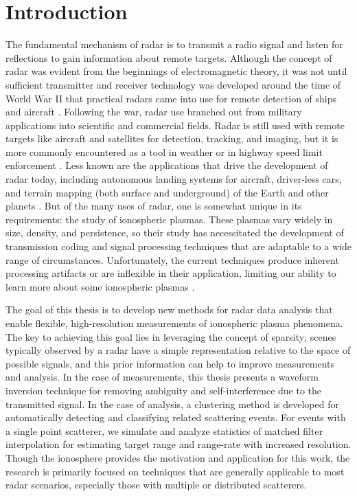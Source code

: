 \chapter{Introduction}
\label{introduction}
The fundamental mechanism of radar is to transmit a radio signal and listen for reflections to gain information about remote targets. Although the concept of radar was evident from the beginnings of electromagnetic theory, it was not until sufficient transmitter and receiver technology was developed around the time of World War II that practical radars came into use for remote detection of ships and aircraft \autocite{Sko01}. Following the war, radar use branched out from military applications into scientific and commercial fields. Radar is still used with remote targets like aircraft and satellites for detection, tracking, and imaging, but it is more commonly encountered as a tool in weather or in highway speed limit enforcement \autocite{MS14}. Less known are the applications that drive the development of radar today, including autonomous landing systems for aircraft, driver-less cars, and terrain mapping (both surface and underground) of the Earth and other planets \autocite{Jol09, MS12}. But of the many uses of radar, one is somewhat unique in its requirements: the study of ionospheric plasmas. These plasmas vary widely in size, density, and persistence, so their study has necessitated the development of transmission coding and signal processing techniques that are adaptable to a wide range of circumstances. Unfortunately, the current techniques produce inherent processing artifacts or are inflexible in their application, limiting our ability to learn more about some ionospheric plasmas \autocite{VLV08a}.

The goal of this thesis is to develop new methods for radar data analysis that enable flexible, high-resolution measurements of ionospheric plasma phenomena. The key to achieving this goal lies in leveraging the concept of sparsity; scenes typically observed by a radar have a simple representation relative to the space of possible signals, and this prior information can help to improve measurements and analysis. In the case of measurements, this thesis presents a waveform inversion technique for removing ambiguity and self-interference due to the transmitted signal. In the case of analysis, a clustering method is developed for automatically detecting and classifying related scattering events. For events with a single point scatterer, we simulate and analyze statistics of matched filter interpolation for estimating target range and range-rate with increased resolution. Though the ionosphere provides the motivation and application for this work, the research is primarily focused on techniques that are generally applicable to most radar scenarios, especially those with multiple or distributed scatterers.

